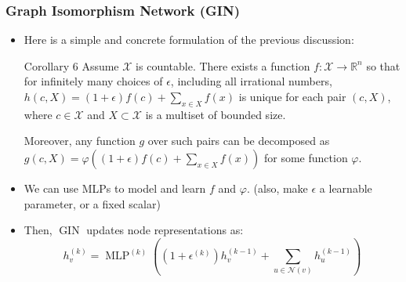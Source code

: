 \documentclass{beamer}
\DeclareMathOperator{\mlp}{MLP}
\DeclareMathOperator{\gin}{GIN}
\begin{document}
\begin{frame}
\frametitle{Graph Isomorphism Network (GIN)}

\begin{itemize}

	\item Here is a simple and concrete formulation of the previous discussion:
	
\begin{block}{Corollary 6}
Assume $\mathcal{X}$ is countable.
There exists a function $f : \mathcal{X} \rightarrow \mathbb{R}^n$ so that for infinitely many choices of $\epsilon$, including all irrational numbers, $h(c, X) = (1 + \epsilon) f(c) + \sum_{x \in X} f(x)$ is unique for each pair $(c, X)$, where $c \in \mathcal{X}$ and $X \subset \mathcal{X}$ is a multiset of bounded size.

Moreover, any function $g$ over such pairs can be decomposed as $g(c, X) = \varphi \left( (1 + \epsilon) f(c) + \sum_{x \in X} f(x) \right)$ for some function $\varphi$.
\end{block} \pause

	\item We can use MLPs to model and learn $f$ and $\varphi$. (also, make $\epsilon$ a learnable parameter, or a fixed scalar) \pause
	
	\item Then, $\gin$ updates node representations as:
	$$h_v^{(k)} = \mlp^{(k)} \left( \left(1 + \epsilon^{(k)} \right) h_v^{(k - 1)} + \sum_{u \in \mathscr{N}(v)} h_u^{(k - 1)} \right)$$
\end{itemize}

\end{frame}

\end{document}
